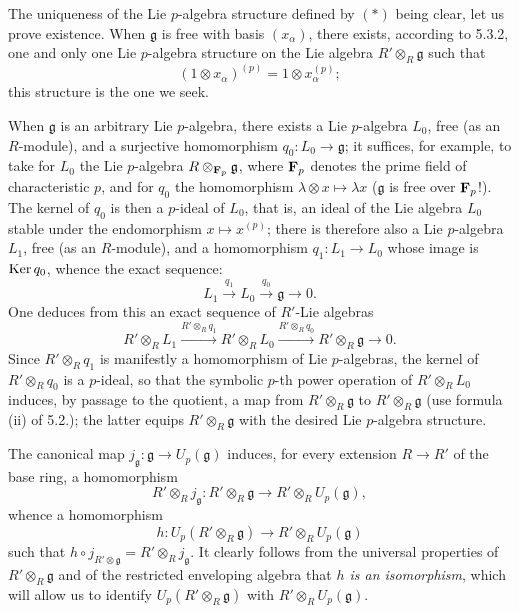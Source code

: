The uniqueness of the Lie $p$-algebra structure defined by $(*)$ being clear, let us prove existence. When $\mathfrak g$ is free with basis $(x_\alpha)$, there exists, according to 5.3.2, one and only one Lie $p$-algebra structure on the Lie algebra $R'\otimes_R\mathfrak g$ such that
\[
(1\otimes x_\alpha)^{(p)}=1\otimes x_\alpha^{(p)};
\]
this structure is the one we seek.

When $\mathfrak g$ is an arbitrary Lie $p$-algebra, there exists a Lie $p$-algebra $L_0$, free (as an $R$-module), and a surjective homomorphism $q_0:L_0\to\mathfrak g$; it suffices, for example, to take for $L_0$ the Lie $p$-algebra $R\otimes_{\mathbf{F}_p}\mathfrak g$, where $\mathbf{F}_p$ denotes the prime field of characteristic $p$, and for $q_0$ the homomorphism $\lambda\otimes x\mapsto\lambda x$ ($\mathfrak g$ is free over $\mathbf{F}_p$!). The kernel of $q_0$ is then a $p$-ideal of $L_0$, that is, an ideal of the Lie algebra $L_0$ stable under the endomorphism $x\mapsto x^{(p)}$; there is therefore also a Lie $p$-algebra $L_1$, free (as an $R$-module), and a homomorphism $q_1:L_1\to L_0$ whose image is $\operatorname{Ker} q_0$, whence the exact sequence:
\[
L_1\xrightarrow{q_1}L_0\xrightarrow{q_0}\mathfrak g\longrightarrow0.
\]
One deduces from this an exact sequence of $R'$-Lie algebras
\[
R'\otimes_R L_1\xrightarrow{R'\otimes_R q_1}R'\otimes_R L_0\xrightarrow{R'\otimes_R q_0}R'\otimes_R\mathfrak g\longrightarrow0.
\]
Since $R'\otimes_R q_1$ is manifestly a homomorphism of Lie $p$-algebras, the kernel of $R'\otimes_R q_0$ is a $p$-ideal, so that the symbolic $p$-th power operation of $R'\otimes_R L_0$ induces, by passage to the quotient, a map from $R'\otimes_R\mathfrak g$ to $R'\otimes_R\mathfrak g$ (use formula (ii) of 5.2.); the latter equips $R'\otimes_R\mathfrak g$ with the desired Lie $p$-algebra structure.

The canonical map $j_{\mathfrak g}:\mathfrak g\to U_p(\mathfrak g)$ induces, for every extension $R\to R'$ of the base ring, a homomorphism
\[
R'\otimes_R j_{\mathfrak g}:R'\otimes_R\mathfrak g\longrightarrow R'\otimes_R U_p(\mathfrak g),
\]
whence a homomorphism
\[
h:U_p(R'\otimes_R\mathfrak g)\longrightarrow R'\otimes_R U_p(\mathfrak g)
\]
such that $h\circ j_{R'\otimes\mathfrak g}=R'\otimes_Rj_{\mathfrak g}$. It clearly follows from the universal properties of $R'\otimes_R\mathfrak g$ and of the restricted enveloping algebra that \emph{$h$ is an isomorphism}, which will allow us to identify $U_p(R'\otimes_R\mathfrak g)$ with $R'\otimes_R U_p(\mathfrak g)$.
